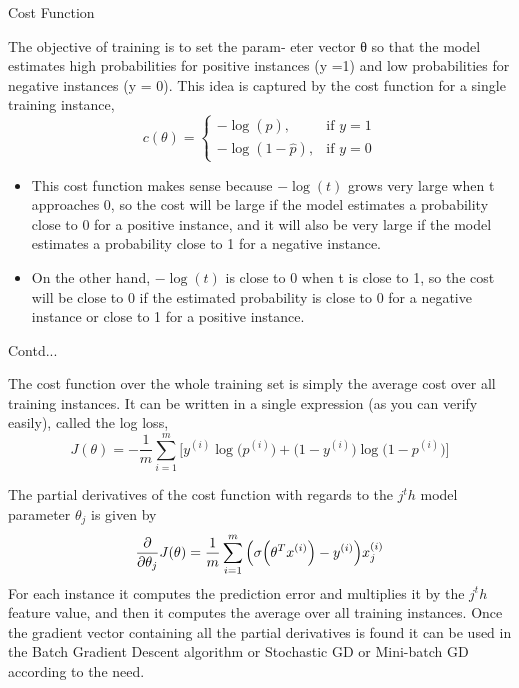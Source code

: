 \documentclass{beamer}
\begin{document}
\begin{frame}{Cost Function}
\begin{flushleft}
The objective of training is to set the param‐
eter vector θ so that the model estimates high probabilities for positive instances (y =1) and low probabilities for negative instances (y = 0). This idea is captured by the cost function for a single training instance,
\begin{equation*}
	c(\theta) = 
	\begin{cases}
		-\log(\hat{p}),& \text{if } y = 1\\
		-\log(1-\hat{p}),& \text{if } y = 0
	\end{cases}
\end{equation*}
\begin{itemize}
	\item This cost function makes sense because $-\log(t)$ grows very large when t approaches 0, so the cost will be large if the model estimates a probability close to 0 for a positive instance, and it will also be very large if the model estimates a probability close to 1 for a negative instance. 
	\item On the other hand, $-\log(t)$ is close to 0 when t is close to 1, so
the cost will be close to 0 if the estimated probability is close to 0 for a negative instance or close to 1 for a positive instance.
\end{itemize}
	\end{flushleft}
\end{frame}

\begin{frame}{Contd...}
\begin{flushleft}
The cost function over the whole training set is simply the average cost over all training instances. It can be written in a single expression (as you can verify easily), called the log loss,
\begin{equation*}
	J(\theta) = -\frac{1}{m}\sum_{i=1}^{m}\bigg[y^{(i)}\log\Big(p^{(i)}\Big)+\Big(1-y^{(i)}\Big)\log\Big(1 - p^{(i)}\Big)\bigg]
\end{equation*}

The partial derivatives of the cost function with regards to the $j^th$ model parameter $\theta_j$ is given by
\begin{equation*}
	\pdv{}{\theta_j}J(\theta) = \frac{1}{m}\sum_{i=1}^{m}\Big(\sigma\Big(\theta^Tx^{(i)}\Big)-y^{(i)}\Big)x_j^{(i)}
\end{equation*}
For each instance it computes the prediction error and multiplies it by the $j^th$ feature value, and then it computes the average over all training instances. Once the gradient vector containing all the partial derivatives is found it can be used in the Batch Gradient Descent algorithm or Stochastic GD or Mini-batch GD according to the need.
\end{flushleft}
\end{frame}
\end{document}
